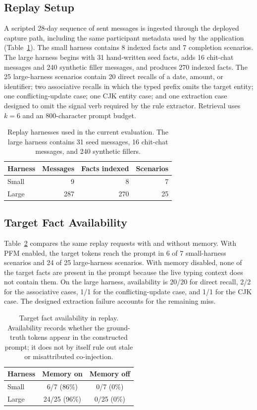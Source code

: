 \documentclass[letterpaper]{article} %
\begin{document}
\subsection{Replay Setup}

A scripted 28-day sequence of sent messages is ingested through the deployed capture path, including the same participant metadata used by the application (Table~\ref{tab:harness}). The small harness contains 8 indexed facts and 7 completion scenarios. The large harness begins with 31 hand-written seed facts, adds 16 chit-chat messages and 240 synthetic filler messages, and produces 270 indexed facts. The 25 large-harness scenarios contain 20 direct recalls of a date, amount, or identifier; two associative recalls in which the typed prefix omits the target entity; one conflicting-update case; one CJK entity case; and one extraction case designed to omit the signal verb required by the rule extractor. Retrieval uses $k=6$ and an 800-character prompt budget.

\begin{table}[t]
\centering
\small
\begin{tabular}{@{}lrrr@{}}
\toprule
Harness & Messages & Facts indexed & Scenarios \\
\midrule
Small & 9 & 8 & 7 \\
Large & 287 & 270 & 25 \\
\bottomrule
\end{tabular}
\caption{Replay harnesses used in the current evaluation. The large harness contains 31 seed messages, 16 chit-chat messages, and 240 synthetic fillers.}
\label{tab:harness}
\end{table}

\subsection{Target Fact Availability}

Table~\ref{tab:availability} compares the same replay requests with and without memory. With PFM enabled, the target tokens reach the prompt in 6 of 7 small-harness scenarios and 24 of 25 large-harness scenarios. With memory disabled, none of the target facts are present in the prompt because the live typing context does not contain them. On the large harness, availability is 20/20 for direct recall, 2/2 for the associative cases, 1/1 for the conflicting-update case, and 1/1 for the CJK case. The designed extraction failure accounts for the remaining miss.

\begin{table}[t]
\centering
\small
\begin{tabular}{@{}lcc@{}}
\toprule
Harness & Memory on & Memory off \\
\midrule
Small & 6/7 (86\%) & 0/7 (0\%) \\
Large & 24/25 (96\%) & 0/25 (0\%) \\
\bottomrule
\end{tabular}
\caption{Target fact availability in replay. Availability records whether the ground-truth tokens appear in the constructed prompt; it does not by itself rule out stale or misattributed co-injection.}
\label{tab:availability}
\end{table}
\end{document}

